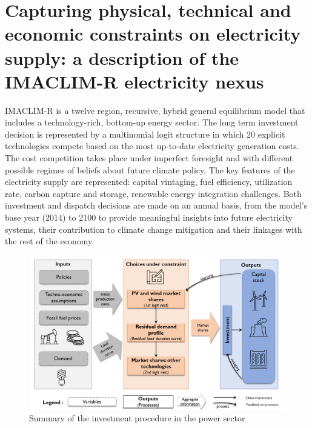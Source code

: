 \section*{Capturing physical, technical and economic constraints on electricity supply: a description of the IMACLIM-R electricity nexus}

IMACLIM-R is a twelve region, recursive, hybrid general equilibrium model that includes a technology-rich, bottom-up energy sector.  The long term investment decision is represented by a multinomial logit structure in which 20 explicit technologies compete based on the most up-to-date electricity generation costs. The cost competition takes place under imperfect foresight and with different possible regimes of beliefs about future climate policy. The key features of the electricity supply are represented: capital vintaging, fuel efficiency, utilization rate, carbon capture and storage, renewable energy integration challenges.  Both investment and dispatch decisions are made on an annual basis, from the model's base year (2014) to 2100 to provide meaningful insights into future electricity systems, their contribution to climate change mitigation and their linkages with the rest of the economy.

\begin{figure}[H]
    \centerline{\includegraphics[scale=0.55]{figures&tables/Summary_nexus.png}} %
    \caption{Summary of the investment procedure in the power sector}
    \label{fig:suminv}
\end{figure}

